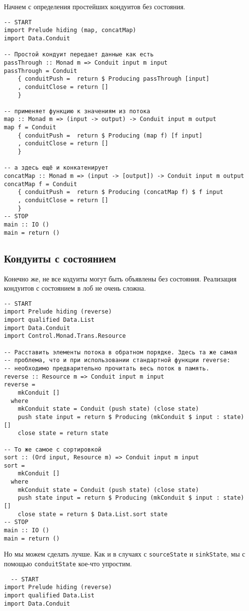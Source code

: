 {Начнем с определения простейших кондуитов без состояния.
\begin{lstlisting}
-- START
import Prelude hiding (map, concatMap)
import Data.Conduit

-- Простой кондуит передает данные как есть
passThrough :: Monad m => Conduit input m input
passThrough = Conduit
    { conduitPush =  return $ Producing passThrough [input]
    , conduitClose = return []
    }

-- применяет функцию к значениям из потока
map :: Monad m => (input -> output) -> Conduit input m output
map f = Conduit
    { conduitPush =  return $ Producing (map f) [f input]
    , conduitClose = return []
    }

-- а здесь ещё и конкатенирует
concatMap :: Monad m => (input -> [output]) -> Conduit input m output
concatMap f = Conduit
    { conduitPush =  return $ Producing (concatMap f) $ f input
    , conduitClose = return []
    }
-- STOP
main :: IO ()
main = return ()
\end{lstlisting}

\subsection{Кондуиты с состоянием}
Конечно же, не все кодуиты могут быть объявлены без состояния.  Реализация 
кондуитов с состоянием в лоб не очень сложна.
\begin{lstlisting}
-- START
import Prelude hiding (reverse)
import qualified Data.List
import Data.Conduit
import Control.Monad.Trans.Resource

-- Расставить элементы потока в обратном порядке. Здесь та же самая
-- проблема, что и при использовании стандартной функции reverse:
-- необходимо предварительно прочитать весь поток в память.
reverse :: Resource m => Conduit input m input
reverse =
    mkConduit []
  where
    mkConduit state = Conduit (push state) (close state)
    push state input = return $ Producing (mkConduit $ input : state) []
    close state = return state

-- То же самое с сортировкой
sort :: (Ord input, Resource m) => Conduit input m input
sort =
    mkConduit []
  where
    mkConduit state = Conduit (push state) (close state)
    push state input = return $ Producing (mkConduit $ input : state) []
    close state = return $ Data.List.sort state
-- STOP
main :: IO ()
main = return ()
\end{lstlisting} 
Но мы можем сделать лучше. Как и в случаях с \lstinline'sourceState' и 
\lstinline'sinkState', мы с помощью \lstinline'conduitState' кое-что упростим.
\begin{lstlisting}
  -- START
import Prelude hiding (reverse)
import qualified Data.List
import Data.Conduit


\end{lstlisting}}
